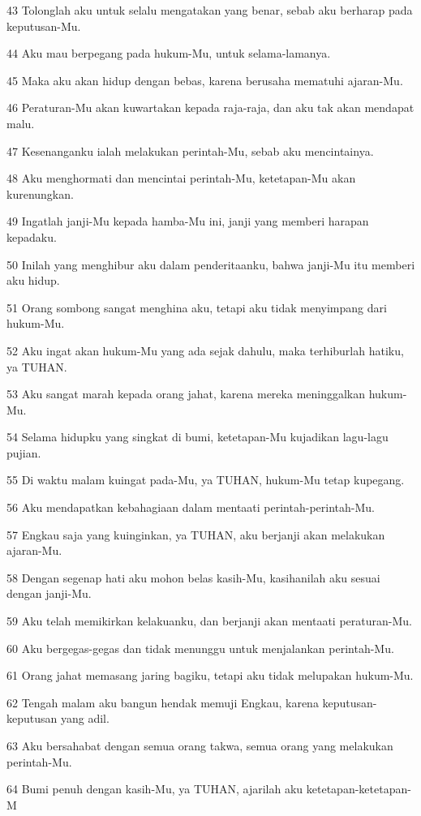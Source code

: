 \par 43 Tolonglah aku untuk selalu mengatakan yang benar, sebab aku berharap pada keputusan-Mu.
\par 44 Aku mau berpegang pada hukum-Mu, untuk selama-lamanya.
\par 45 Maka aku akan hidup dengan bebas, karena berusaha mematuhi ajaran-Mu.
\par 46 Peraturan-Mu akan kuwartakan kepada raja-raja, dan aku tak akan mendapat malu.
\par 47 Kesenanganku ialah melakukan perintah-Mu, sebab aku mencintainya.
\par 48 Aku menghormati dan mencintai perintah-Mu, ketetapan-Mu akan kurenungkan.
\par 49 Ingatlah janji-Mu kepada hamba-Mu ini, janji yang memberi harapan kepadaku.
\par 50 Inilah yang menghibur aku dalam penderitaanku, bahwa janji-Mu itu memberi aku hidup.
\par 51 Orang sombong sangat menghina aku, tetapi aku tidak menyimpang dari hukum-Mu.
\par 52 Aku ingat akan hukum-Mu yang ada sejak dahulu, maka terhiburlah hatiku, ya TUHAN.
\par 53 Aku sangat marah kepada orang jahat, karena mereka meninggalkan hukum-Mu.
\par 54 Selama hidupku yang singkat di bumi, ketetapan-Mu kujadikan lagu-lagu pujian.
\par 55 Di waktu malam kuingat pada-Mu, ya TUHAN, hukum-Mu tetap kupegang.
\par 56 Aku mendapatkan kebahagiaan dalam mentaati perintah-perintah-Mu.
\par 57 Engkau saja yang kuinginkan, ya TUHAN, aku berjanji akan melakukan ajaran-Mu.
\par 58 Dengan segenap hati aku mohon belas kasih-Mu, kasihanilah aku sesuai dengan janji-Mu.
\par 59 Aku telah memikirkan kelakuanku, dan berjanji akan mentaati peraturan-Mu.
\par 60 Aku bergegas-gegas dan tidak menunggu untuk menjalankan perintah-Mu.
\par 61 Orang jahat memasang jaring bagiku, tetapi aku tidak melupakan hukum-Mu.
\par 62 Tengah malam aku bangun hendak memuji Engkau, karena keputusan-keputusan yang adil.
\par 63 Aku bersahabat dengan semua orang takwa, semua orang yang melakukan perintah-Mu.
\par 64 Bumi penuh dengan kasih-Mu, ya TUHAN, ajarilah aku ketetapan-ketetapan-M
